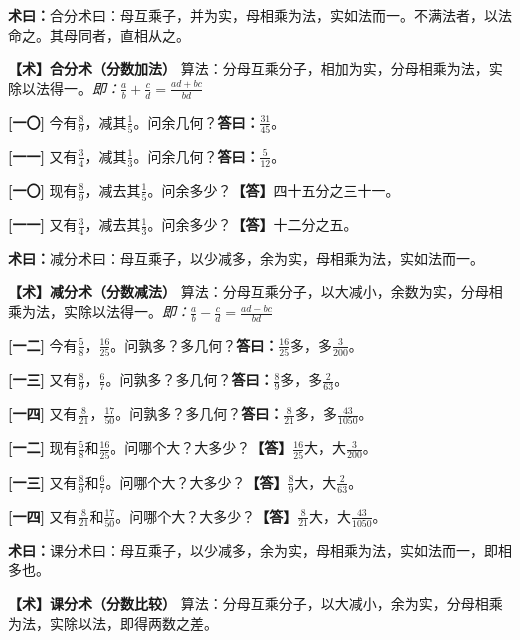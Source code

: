\documentclass[10pt,a4paper]{article}
\newlength{\lw}
\newlength{\rw}
\newcommand{\bilingc}[2]{%
  \par\vspace{0.1em}%
  \noindent\begin{minipage}[t]{\lw}
  {\small #1}
  \end{minipage}%
  \hfill%
  \begin{minipage}[t]{\rw}
  {\small #2}
  \end{minipage}%
  \vspace{0.1em}%
}
\newcommand{\da}{\textbf{\textcolor{answercolor}{答曰：}}}
\newcommand{\daB}{\textbf{\textcolor{answercolor}{【答】}}}
\newcommand{\shu}{\textbf{\textcolor{methodcolor}{术曰：}}}
\newcommand{\shuB}{\textbf{\textcolor{methodcolor}{【术】}}}
\newcommand{\pn}[1]{\textbf{[#1]}}
\newcommand{\sk}{\vspace{0.1em}}
\begin{document}
\sk

\bilingc{
\shu 合分术曰：母互乘子，并为实，母相乘为法，实如法而一。不满法者，以法命之。其母同者，直相从之。
}{
\shuB \textbf{合分术（分数加法）} 算法：分母互乘分子，相加为实，分母相乘为法，实除以法得一。\textit{即：$\frac{a}{b}+\frac{c}{d}=\frac{ad+bc}{bd}$}
}

\vspace{0.3em}

\bilingc{
\pn{一〇} 今有$\frac89$，减其$\frac15$。问余几何？\quad\da $\frac{31}{45}$。

\pn{一一} 又有$\frac34$，减其$\frac13$。问余几何？\quad\da $\frac{5}{12}$。
}{
\pn{一〇} 现有$\frac{8}{9}$，减去其$\frac{1}{5}$。问余多少？\quad\daB 四十五分之三十一。

\pn{一一} 又有$\frac{3}{4}$，减去其$\frac{1}{3}$。问余多少？\quad\daB 十二分之五。
}

\sk

\bilingc{
\shu 减分术曰：母互乘子，以少减多，余为实，母相乘为法，实如法而一。
}{
\shuB \textbf{减分术（分数减法）} 算法：分母互乘分子，以大减小，余数为实，分母相乘为法，实除以法得一。\textit{即：$\frac{a}{b}-\frac{c}{d}=\frac{ad-bc}{bd}$}
}

\vspace{0.3em}

\bilingc{
\pn{一二} 今有$\frac58$，$\frac{16}{25}$。问孰多？多几何？\quad\da $\frac{16}{25}$多，多$\frac{3}{200}$。

\pn{一三} 又有$\frac89$，$\frac67$。问孰多？多几何？\quad\da $\frac89$多，多$\frac{2}{63}$。

\pn{一四} 又有$\frac{8}{21}$，$\frac{17}{50}$。问孰多？多几何？\quad\da $\frac{8}{21}$多，多$\frac{43}{1050}$。
}{
\pn{一二} 现有$\frac{5}{8}$和$\frac{16}{25}$。问哪个大？大多少？\quad\daB $\frac{16}{25}$大，大$\frac{3}{200}$。

\pn{一三} 又有$\frac{8}{9}$和$\frac{6}{7}$。问哪个大？大多少？\quad\daB $\frac{8}{9}$大，大$\frac{2}{63}$。

\pn{一四} 又有$\frac{8}{21}$和$\frac{17}{50}$。问哪个大？大多少？\quad\daB $\frac{8}{21}$大，大$\frac{43}{1050}$。
}

\sk

\bilingc{
\shu 课分术曰：母互乘子，以少减多，余为实，母相乘为法，实如法而一，即相多也。
}{
\shuB \textbf{课分术（分数比较）} 算法：分母互乘分子，以大减小，余为实，分母相乘为法，实除以法，即得两数之差。
}

\vspace{0.3em}
\end{document}
